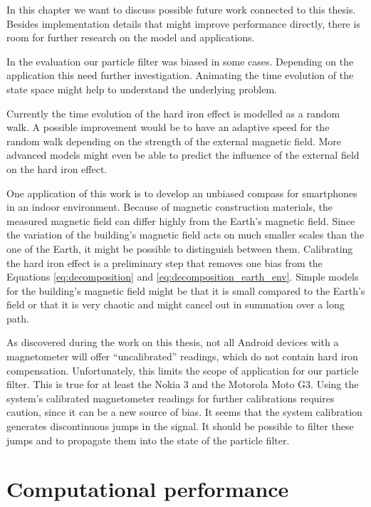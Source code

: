 
In this chapter we want to discuss possible future work connected to this thesis. Besides implementation details that might improve performance directly, there is room for further research on the model and applications.

In the evaluation our particle filter was biased in some cases. Depending on the application this need further investigation. Animating the time evolution of the state space might help to understand the underlying problem.

Currently the time evolution of the hard iron effect is modelled as a random walk. A possible improvement would be to have an adaptive speed for the random walk depending on the strength of the external magnetic field. More advanced models might even be able to predict the influence of the external field on the hard iron effect.

One application of this work is to develop an unbiased compass for smartphones in an indoor environment. Because of magnetic construction materials, the measured magnetic field can differ highly from the Earth's magnetic field. Since the variation of the building's magnetic field acts on much smaller scales than the one of the Earth, it might be possible to distinguish between them. Calibrating the hard iron effect is a preliminary step that removes one bias from the Equations \ref{eq:decomposition} and \ref{eq:decomposition_earth_env}. Simple models for the building's magnetic field might be that it is small compared to the Earth's field or that it is very chaotic and might cancel out in summation over a long path.

As discovered during the work on this thesis, not all Android devices with a magnetometer will offer ``uncalibrated'' readings, which do not contain hard iron compensation. Unfortunately, this limits the scope of application for our particle filter. This is true for at least the Nokia 3 and the Motorola Moto G3. Using the system's calibrated magnetometer readings for further calibrations requires caution, since it can be a new source of bias. It seems that the system calibration generates discontinuous jumps in the signal. It should be possible to filter these jumps and to propagate them into the state of the particle filter.

\section{Computational performance}

